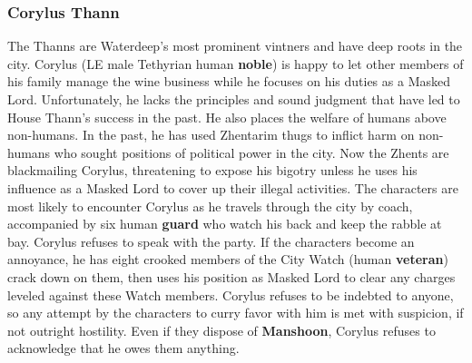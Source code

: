 \documentclass[10pt,a4paper,twoside,twocolumn,openany,nodeprecatedcode]{dndbook}
\begin{document}
\subsubsection{Corylus Thann}
The Thanns are Waterdeep's most prominent vintners and have deep roots in the city. Corylus (LE male Tethyrian human \textbf{noble}) is happy to let other members of his family manage the wine business while he focuses on his duties as a Masked Lord. Unfortunately, he lacks the principles and sound judgment that have led to House Thann's success in the past. He also places the welfare of humans above non-humans. In the past, he has used Zhentarim thugs to inflict harm on non-humans who sought positions of political power in the city. Now the Zhents are blackmailing Corylus, threatening to expose his bigotry unless he uses his influence as a Masked Lord to cover up their illegal activities.
The characters are most likely to encounter Corylus as he travels through the city by coach, accompanied by six human \textbf{guard} who watch his back and keep the rabble at bay. Corylus refuses to speak with the party. If the characters become an annoyance, he has eight crooked members of the City Watch (human \textbf{veteran}) crack down on them, then uses his position as Masked Lord to clear any charges leveled against these Watch members. Corylus refuses to be indebted to anyone, so any attempt by the characters to curry favor with him is met with suspicion, if not outright hostility. Even if they dispose of \textbf{Manshoon}, Corylus refuses to acknowledge that he owes them anything.
\end{document}

